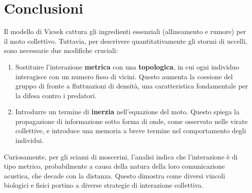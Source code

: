 \section{Conclusioni}
Il modello di Vicsek cattura gli ingredienti essenziali (allineamento e rumore) per il moto collettivo. Tuttavia, per descrivere quantitativamente gli stormi di uccelli, sono necessarie due modifiche cruciali:
\begin{enumerate}
    \item Sostituire l'interazione \textbf{metrica} con una \textbf{topologica}, in cui ogni individuo interagisce con un numero fisso di vicini. Questo aumenta la coesione del gruppo di fronte a fluttuazioni di densità, una caratteristica fondamentale per la difesa contro i predatori.
    \item Introdurre un termine di \textbf{inerzia} nell'equazione del moto. Questo spiega la propagazione di informazione sotto forma di onde, come osservato nelle virate collettive, e introduce una memoria a breve termine nel comportamento degli individui.
\end{enumerate}
Curiosamente, per gli sciami di moscerini, l'analisi indica che l'interazione è di tipo metrico, probabilmente a causa della natura della loro comunicazione acustica, che decade con la distanza. Questo dimostra come diversi vincoli biologici e fisici portino a diverse strategie di interazione collettiva.
